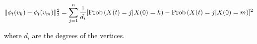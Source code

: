 \begin{equation}\label{diffusionDistance}
\lVert\phi_{t}(v_k) - \phi_{t}(v_m)\rVert_{2}^{2} = 
\displaystyle \sum_{j=1}^{n} \frac{1}{d_{i}} 
[ \text{Prob}\left( X(t) = j | X(0) = k \right) -  \text{Prob}\left( X(t) = j | X(0) = m \right) ]^{2}
\end{equation}

where $d_{i}$ are the degrees of the vertices.\\








